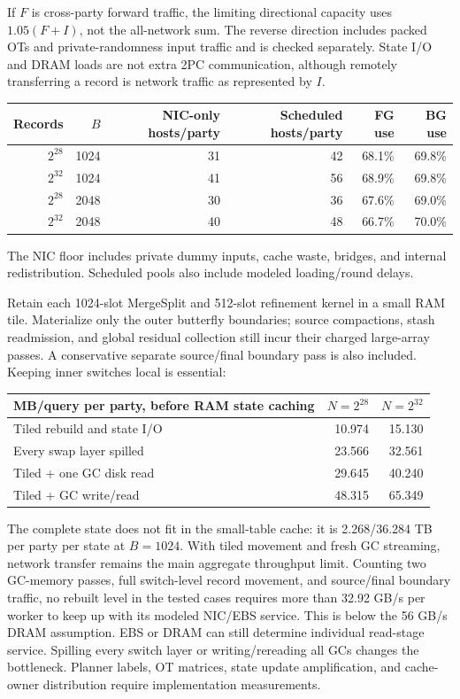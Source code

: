 \documentclass[11pt]{article}
\begin{document}
If $F$ is cross-party forward traffic, the limiting directional capacity
uses $1.05(F+I)$, not the all-network sum. The reverse direction includes
packed OTs and private-randomness input traffic and is checked separately.
State I/O and DRAM loads are not extra 2PC communication, although remotely
transferring a record is network traffic as represented by $I$.

\begin{center}\footnotesize
\begin{tabular}{rrrrrr}\toprule
Records & $B$ & NIC-only hosts/party & Scheduled hosts/party & FG use & BG use\\\midrule
$2^{28}$ & 1024 & 31 & 42 & 68.1\% & 69.8\%\\
$2^{32}$ & 1024 & 41 & 56 & 68.9\% & 69.8\%\\
$2^{28}$ & 2048 & 30 & 36 & 67.6\% & 69.0\%\\
$2^{32}$ & 2048 & 40 & 48 & 66.7\% & 70.0\%\\
\bottomrule\end{tabular}\end{center}
{\footnotesize The NIC floor includes private dummy inputs, cache waste, bridges, and internal redistribution. Scheduled pools also include modeled loading/round delays.\par}

Retain each 1024-slot MergeSplit and 512-slot refinement kernel in a small
RAM tile. Materialize only the outer butterfly boundaries; source
compactions, stash readmission, and global residual collection still incur
their charged large-array passes. A conservative separate source/final
boundary pass is also included. Keeping inner switches local is essential:

\begin{center}\footnotesize
\begin{tabular}{lrr}\toprule
MB/query per party, before RAM state caching & $N=2^{28}$ & $N=2^{32}$\\\midrule
Tiled rebuild and state I/O & 10.974 & 15.130\\
Every swap layer spilled & 23.566 & 32.561\\
Tiled + one GC disk read & 29.645 & 40.240\\
Tiled + GC write/read & 48.315 & 65.349\\
\bottomrule\end{tabular}\end{center}

The complete state does not fit in the small-table cache: it is
2.268/36.284 TB per party per state at $B=1024$. With tiled movement and
fresh GC streaming, network transfer remains the main aggregate throughput
limit. Counting two GC-memory passes, full switch-level record movement,
and source/final boundary traffic, no rebuilt level in the tested cases
requires more than 32.92 GB/s per worker to keep up with its modeled
NIC/EBS service. This is below the 56 GB/s DRAM assumption. EBS or DRAM
can still determine individual read-stage service.
Spilling every switch layer or writing/rereading all GCs changes the
bottleneck. Planner labels, OT matrices, state update amplification, and
cache-owner distribution require implementation measurements.
\end{document}
